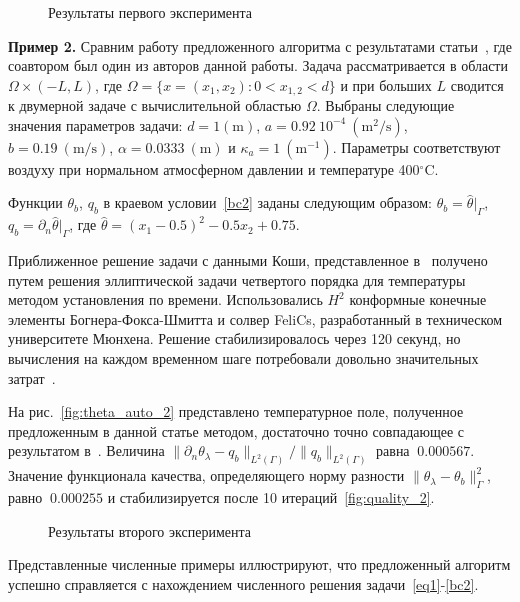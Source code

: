 \begin{figure}[H]
    \centering
    \caption{Результаты первого эксперимента}
\end{figure}

\textbf{Пример 2.}
Сравним работу предложенного алгоритма с результатами статьи~\cite{CNSNS19},
где соавтором был один из авторов данной работы.
Задача рассматривается в области $\Omega \times (-L,L)$,
где $\Omega = \{ x = (x_1,x_2) \colon 0 < x_{1,2} < d\}$
и при больших $L$ сводится к двумерной задаче с вычислительной областью $\Omega$.
Выбраны следующие значения параметров задачи:
$d = \mathrm{1(m)}$, $a = 0.92~10^{-4}~\mathrm{(m^2/s)}$, $b= 0.19~\mathrm{(m/s)}$,
$\alpha = 0.0333~\mathrm{(m)}$ и $\kappa_a = 1~\mathrm{(m^{-1})}$.
Параметры соответствуют воздуху при нормальном атмосферном давлении и температуре 400$^\circ$C\@.

Функции $\theta_b$, $q_b$ в краевом условии~\eqref{bc2} заданы следующим образом:
$\theta_b = \widehat{\theta}|_{\Gamma}$, $q_b = \partial_n \widehat{\theta}|_{\Gamma}$, где
$\widehat{\theta} = (x_1-0.5)^2 - 0.5x_2+0.75$.

Приближенное решение задачи с данными Коши, представленное в~\cite{CNSNS19}
получено путем решения эллиптической задачи четвертого
порядка для температуры методом установления по времени.
Использовались $H^2$ конформные конечные элементы Богнера-Фокса-Шмитта и
солвер FeliCs, разработанный в техническом университете Мюнхена.
Решение стабилизировалось через 120 секунд, но вычисления на каждом временном
шаге потребовали довольно значительных затрат~\cite{CNSNS19}.

На рис.~\ref{fig:theta_auto_2} представлено температурное поле, полученное
предложенным в данной статье методом, достаточно точно совпадающее с результатом в~\cite{CNSNS19}.
Величина $\|\partial_n\theta_\lambda-q_b\|_{L^2(\Gamma)}/\|q_b\|_{L^2(\Gamma)}$ равна $~0.000567$.
Значение функционала качества, определяющего норму разности $\|\theta_\lambda -\theta_b\|^2_\Gamma$,
равно $~0.000255$ и стабилизируется после 10 итераций~\ref{fig:quality_2}.

\begin{figure}[H]
    \centering
    \caption{Результаты второго эксперимента}
\end{figure}

Представленные численные примеры иллюстрируют, что предложенный алгоритм успешно справляется
с нахождением численного решения задачи~\eqref{eq1}-\eqref{bc2}.
